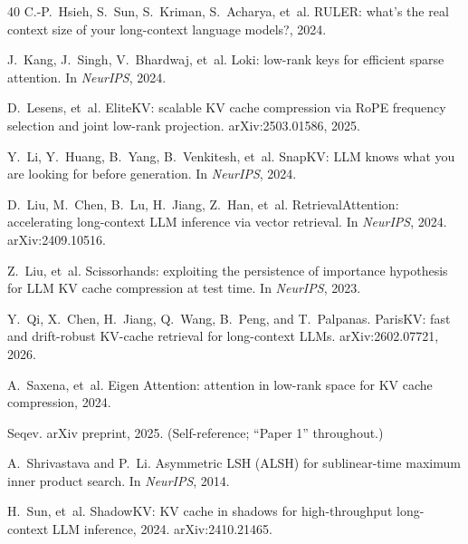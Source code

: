 \documentclass[11pt]{article}
\theoremstyle{definition}
\theoremstyle{remark}
\theoremstyle{plain}
\begin{document}
\begin{thebibliography}{40}
C.-P.~Hsieh, S.~Sun, S.~Kriman, S.~Acharya, et~al.
\newblock RULER: what's the real context size of your long-context language models?, 2024.

J.~Kang, J.~Singh, V.~Bhardwaj, et~al.
\newblock Loki: low-rank keys for efficient sparse attention.
\newblock In \emph{NeurIPS}, 2024.

D.~Lesens, et~al.
\newblock EliteKV: scalable KV cache compression via RoPE frequency selection and joint low-rank projection.
\newblock arXiv:2503.01586, 2025.

Y.~Li, Y.~Huang, B.~Yang, B.~Venkitesh, et~al.
\newblock SnapKV: LLM knows what you are looking for before generation.
\newblock In \emph{NeurIPS}, 2024.

D.~Liu, M.~Chen, B.~Lu, H.~Jiang, Z.~Han, et~al.
\newblock RetrievalAttention: accelerating long-context LLM inference via vector retrieval.
\newblock In \emph{NeurIPS}, 2024. arXiv:2409.10516.

Z.~Liu, et~al.
\newblock Scissorhands: exploiting the persistence of importance hypothesis for LLM KV cache compression at test time.
\newblock In \emph{NeurIPS}, 2023.

Y.~Qi, X.~Chen, H.~Jiang, Q.~Wang, B.~Peng, and T.~Palpanas.
\newblock ParisKV: fast and drift-robust KV-cache retrieval for long-context LLMs.
\newblock arXiv:2602.07721, 2026.

A.~Saxena, et~al.
\newblock Eigen Attention: attention in low-rank space for KV cache compression, 2024.

Seqev.
\newblock arXiv preprint, 2025.
\newblock (Self-reference; ``Paper 1'' throughout.)

A.~Shrivastava and P.~Li.
\newblock Asymmetric LSH (ALSH) for sublinear-time maximum inner product search.
\newblock In \emph{NeurIPS}, 2014.

H.~Sun, et~al.
\newblock ShadowKV: KV cache in shadows for high-throughput long-context LLM inference, 2024.
\newblock arXiv:2410.21465.


\end{thebibliography}
\end{document}
